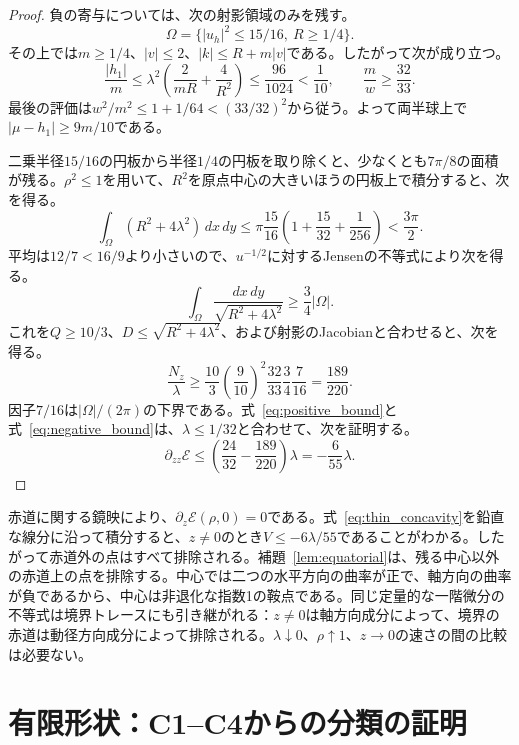 \begin{proof}
負の寄与については、次の射影領域のみを残す。
\[
 \Omega=\{|u_h|^2\le15/16,\ R\ge1/4\}.
\]
その上では$m\ge1/4$、$|v|\le2$、$|k|\le R+m|v|$である。したがって次が成り立つ。
\[
 \frac{|h_1|}{m}\le\lambda^2\left(\frac2{mR}+\frac4{R^2}\right)
 \le\frac{96}{1024}<\frac1{10},\qquad \frac m w\ge\frac{32}{33}.
\]
最後の評価は$w^2/m^2\le1+1/64<(33/32)^2$から従う。よって両半球上で$|\mu-h_1|\ge9m/10$である。

二乗半径$15/16$の円板から半径$1/4$の円板を取り除くと、少なくとも$7\pi/8$の面積が残る。$\rho^2\le1$を用いて、$R^2$を原点中心の大きいほうの円板上で積分すると、次を得る。
\[
 \int_\Omega(R^2+4\lambda^2)\,dx\,dy
 \le\pi\frac{15}{16}\left(1+\frac{15}{32}+\frac1{256}\right)<\frac{3\pi}{2}.
\]
平均は$12/7<16/9$より小さいので、$u^{-1/2}$に対するJensenの不等式により次を得る。
\[
 \int_\Omega\frac{dx\,dy}{\sqrt{R^2+4\lambda^2}}\ge\frac34|\Omega|.
\]
これを$Q\ge10/3$、$D\le\sqrt{R^2+4\lambda^2}$、および射影のJacobianと合わせると、次を得る。
\begin{equation}\label{eq:negative_bound}
 \frac{N_z}{\lambda}\ge\frac{10}{3}\left(\frac9{10}\right)^2
 \frac{32}{33}\frac34\frac7{16}=\frac{189}{220}.
\end{equation}
因子$7/16$は$|\Omega|/(2\pi)$の下界である。式~\eqref{eq:positive_bound}と式~\eqref{eq:negative_bound}は、$\lambda\le1/32$と合わせて、次を証明する。
\[
 \partial_{zz}\mathcal E\le\left(\frac{24}{32}-\frac{189}{220}\right)\lambda=-\frac6{55}\lambda.
\]
\end{proof}

赤道に関する鏡映により、$\partial_z\mathcal E(\rho,0)=0$である。式~\eqref{eq:thin_concavity}を鉛直な線分に沿って積分すると、$z\ne0$のとき$V\le-6\lambda/55$であることがわかる。したがって赤道外の点はすべて排除される。補題~\ref{lem:equatorial}は、残る中心以外の赤道上の点を排除する。中心では二つの水平方向の曲率が正で、軸方向の曲率が負であるから、中心は非退化な指数1の鞍点である。同じ定量的な一階微分の不等式は境界トレースにも引き継がれる：$z\ne0$は軸方向成分によって、境界の赤道は動径方向成分によって排除される。$\lambda\downarrow0$、$\rho\uparrow1$、$z\to0$の速さの間の比較は必要ない。

\section{有限形状：C1--C4からの分類の証明}\label{sec:finite_assembly}

